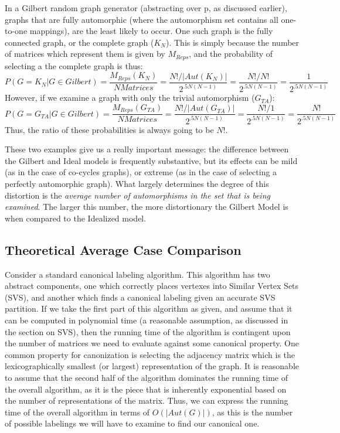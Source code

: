In a Gilbert random graph generator (abstracting over p, as discussed earlier), graphs that are fully automorphic (where the automorphism set contains all one-to-one mappings), are the least likely to occur.
One such graph is the fully connected graph, or the complete graph ($K_N$).
This is simply because the number of matrices which represent them is given by $M_{Reps}$, and the probability of selecting a the complete graph is thus:
$$P(G = K_N | G \in Gilbert) =  \frac{M_{Reps}(K_N)}{NMatrices} = \frac{N! / |Aut(K_N)|}{2^{.5N(N-1)}} = \frac{N! / N!}{2^{.5N(N-1)}} = \frac{1}{2^{.5N(N-1)}}$$
However, if we examine a graph with only the trivial automorphism ($G_{TA}$):
$$P(G = G_{TA} | G \in Gilbert) =  \frac{M_{Reps}(G_{TA})}{NMatrices} = \frac{N! / |Aut(G_{TA})|}{2^{.5N(N-1)}} = \frac{N! / 1}{2^{.5N(N-1)}} = \frac{N!}{2^{.5N(N-1)}}$$
Thus, the ratio of these probabilities is always going to be $N!$.

These two examples give us a really important message: the difference between the Gilbert and Ideal models is frequently substantive, but its effects can be mild (as in the case of co-cycles graphs), or extreme (as in the case of selecting a perfectly automorphic graph).
What largely determines the degree of this distortion is the \emph{average number of automorphisms in the set that is being examined}. 
The larger this number, the more distortionary the Gilbert Model is when compared to the Idealized model.

\subsection{Theoretical Average Case Comparison}

Consider a standard canonical labeling algorithm.
This algorithm has two abstract components, one which correctly places vertexes into Similar Vertex Sets (SVS), and another which finds a canonical labeling given an accurate SVS partition.
If we take the first part of this algorithm as given, and assume that it can be computed in polynomial time (a reasonable assumption, as discussed in the section on SVS), then the running time of the algorithm is contingent upon the number of matrices we need to evaluate against some canonical property.
One common property for canonization is selecting the adjacency matrix which is the lexicographically smallest (or largest) representation of the graph.
It is reasonable to assume that the second half of the algorithm dominates the running time of the overall algorithm, as it is the piece that is inherently exponential based on the number of representations of the matrix.
Thus,  we can express the running time of the overall algorithm in terms of $O(|Aut(G)|)$, as this is the number of possible labelings we will have to examine to find our canonical one.

